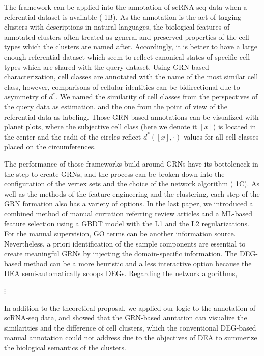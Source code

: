 \documentclass{article}
\begin{document}
The framework can be applied into the annotation of scRNA-seq data when a referential dataset is available 
(\figurename{ 1B}). As the annotation is the act of tagging clusters with descriptions in natural languages, the biological 
features of annotated clusters often treated as general and preserved properties of the cell types which the clusters 
are named after. Accordingly, it is better to have a large enough referential dataset which seem to reflect canonical 
states of specific cell types which are shared with the query dataset. Using GRN-based characterization, cell classes 
are annotated with the name of the most similar cell class, however, comparisons of cellular identities can be 
bidirectional due to asymmetry of $d^*$. We named the similarity of cell classes from the perspectives of the query 
data as estimation, and the one from the point of view of the referential data as labeling. Those GRN-based 
annotations can be visualized with planet plots, where the subjective cell class (here we denote it $[x]$) is located in 
the center and the radii of the circles reflect $d^*([x],\cdot)$ values for all cell classes placed on the circumferences.

The performance of those frameworks build around GRNs have its bottoleneck in the step to create GRNs, and 
the process can be broken down into the configuration of the vertex sets and the choice of the network algorithm 
(\figurename{ 1C}). As well as the methods of the feature engineering and the clustering, each step of the GRN formation 
also has a variety of options. In the last paper, we introduced a combined method of manual curration referring 
review articles and a \ac{ML}-based feature selection using a \ac{GBDT} 
model with the L1 and the L2 regularizations\cite{okano2023set}. For the manual supervision, \ac{GO} terms can be 
another information source. Nevertheless, a priori identification of the sample components are essential to create 
meaningful GRNs by injecting the domain-specific information. The \ac{DEG}-based 
method can be a more heuristic and a less interactive option because the \ac{DEA} 
semi-automatically scoops DEGs. Regarding the network algorithms, 

$\vdots$

In addition to the theoretical proposal, we applied our logic to 
the annotation of scRNA-seq data, and showed that the GRN-based anntation can visualize the similarities and the
difference of cell clusters, which the conventional \ac{DEG}-based manual annotation could not address due to the objectives of \ac{DEA} to summerize the biological semantics 
of the clusters.
\end{document}
